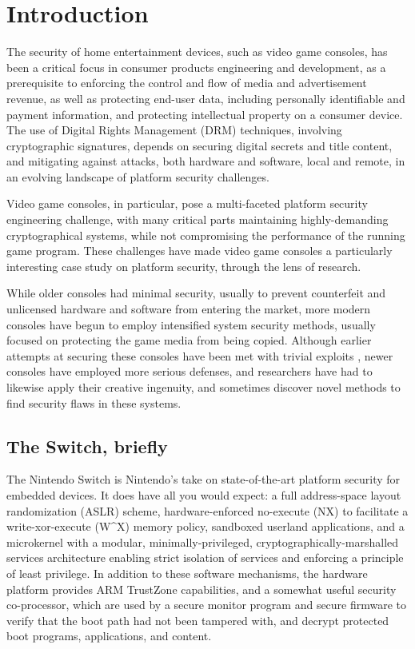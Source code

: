 \documentclass[journal]{IEEEtran}
\begin{document}
\section{Introduction}

The security of home entertainment devices, such as video game consoles, has been a
critical focus in consumer products engineering and development, as a prerequisite to
enforcing the control and flow of media and advertisement revenue, as well as
protecting end-user data, including personally identifiable and payment information,
and protecting intellectual property on a consumer device. The use of
Digital Rights Management (DRM) techniques, involving cryptographic signatures,
depends on securing digital secrets and title content, and mitigating
against attacks, both hardware and software, local and remote, in an evolving
landscape of platform security challenges.

Video game consoles, in particular, pose a multi-faceted platform security
engineering challenge, with many critical parts maintaining highly-demanding
cryptographical systems, while not compromising the performance of the running
game program. These challenges have made video game consoles a particularly
interesting case study on platform security, through the lens of research.

While older consoles had minimal security, usually to prevent counterfeit and
unlicensed hardware and software from entering the market, more modern consoles
have begun to employ intensified system security methods, usually focused on
protecting the game media from being copied. Although earlier attempts at securing
these consoles have been met with trivial exploits \cite{wii} \cite{ps3}, newer
consoles have employed more serious defenses, and researchers have had to likewise
apply their creative ingenuity, and sometimes discover novel methods \cite{vita}
to find security flaws in these systems.

\subsection*{The Switch, briefly}

The Nintendo Switch is Nintendo's take on state-of-the-art platform security for
embedded devices. It does have all you would expect: a full address-space layout
randomization (ASLR) scheme, hardware-enforced no-execute (NX) to facilitate a
write-xor-execute (W\^{}X) memory policy, sandboxed userland applications,
and a microkernel with a modular, minimally-privileged, cryptographically-marshalled
services architecture enabling strict isolation of services and enforcing a principle
of least privilege. In addition to these software mechanisms, the hardware platform
provides ARM TrustZone capabilities, and a somewhat useful security co-processor,
which are used by a secure monitor program and secure firmware to verify that the
boot path had not been tampered with, and decrypt protected boot programs, applications,
and content.
\end{document}
